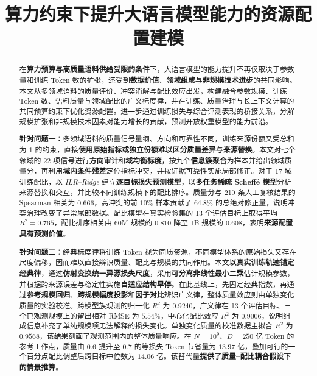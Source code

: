 \documentclass[bwprint]{gmcmthesis}
\title{算力约束下提升大语言模型能力的资源配置建模}
\begin{document}
\maketitle

\begin{abstract}
    在\textbf{算力预算与高质量语料供给受限的条件}下，大语言模型的能力提升不再仅取决于参数量和训练 Token 数的扩张，还受到\textbf{数据价值}、\textbf{领域组成}与\textbf{非规模技术进步}的共同影响。本文从多领域语料的质量评价、冲突消解与配比效应出发，构建融合参数规模、训练 Token 数、语料质量与领域配比的广义标度律，并在训练、质量治理与长上下文计算的共同预算约束下优化资源配置。进一步通过训练损失与综合评测表现的桥接关系，分解规模扩张和非规模技术因素对能力增长的贡献，预测开放权重模型的能力前沿。

    \textbf{针对问题一：}多领域语料的质量信号量纲、方向和可靠性不同，训练来源份额又受总和为 $1$ 的约束，直接\textbf{使用原始指标或独立份额难以区分质量差异与来源替换}。本文对七个领域的 22 项信号进行\textbf{方向审计}和\textbf{域均衡标度}，按九个\textbf{信息簇聚合}为样本并给出领域质量分，再利用\textbf{域内条件残差}定位指标冲突，并按证据可靠性实施局部修正。对于 17 域训练配比，以\textit{ ILR--Ridge} 建立\textbf{逐目标损失预测模型}，以\textbf{多任务稀疏 Scheff\'e 模型}分析来源替换和交互，并比较不同训练规模下的配比排序。质量分与 210 条人工复核结果的 Spearman 相关为 $0.666$，高冲突的前 $10\%$ 样本贡献了 $64.8\%$ 的总绝对修正量，说明冲突治理改变了异常尾部数据。配比模型在真实检验集的 13 个评估目标上取得平均 $R^2=0.765$，配比排序相关由 60M 规模的 $0.810$ 降至 1B 规模的 $0.608$，表明\textbf{来源配置具有预测价值}。

    \textbf{针对问题二：}经典标度律将训练 Token 视为同质资源，不同模型体系的原始损失又存在尺度偏移，因而难以直接辨识质量、配比与规模的共同作用。本文\textbf{以真实训练轨迹锚定经典律}，通过\textbf{仿射变换统一异源损失尺度}，采用\textbf{可分离非线性最小二乘}估计规模参数，并根据跨来源误差与稳定性实施\textbf{自适应结构早停}。在此基线上，先固定经典指数，再通过\textbf{参考规模回归}、\textbf{跨规模幅度投影}和\textbf{因子对比}辨识广义律，整体质量效应则由单独变化质量的实验校准。跨模型族观测的归一化 $R^2$ 为 $0.9240$，广义律在 13 个评估目标、三个已观测规模上的留出相对 RMSE 为 $5.54\%$，中心化配比效应 $R^2$ 为 $0.9006$，说明组成信息补充了单纯规模项无法解释的损失变化。单独变化质量的校准数据主拟合 $R^2$ 为 $0.9568$，该结果刻画了观测范围内的整体质量响应。在 $N=10^9$、$D=250$ 亿 Token 的参考工作点，质量由 $0.6$ 提升至 $0.7$ 的等损失 Token 节省量为 $13.97$ 亿，叠加可行的一个百分点配比调整后跨目标中位数为 $14.06$ 亿。该替代量\textbf{提供了质量--配比耦合假设下的情景推算}。


\end{abstract}
\end{document}
